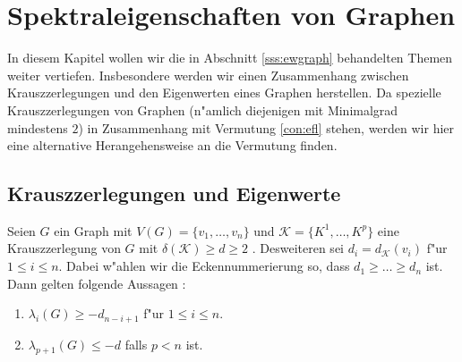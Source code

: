 \section{Spektraleigenschaften von Graphen}

In diesem Kapitel wollen wir die in Abschnitt \ref{sss:ewgraph} behandelten Themen weiter vertiefen. Insbesondere werden wir einen Zusammenhang zwischen Krauszzerlegungen und den Eigenwerten eines Graphen herstellen. Da spezielle Krauszzerlegungen von Graphen (n"amlich diejenigen mit Minimalgrad mindestens $2$) in Zusammenhang mit Vermutung \ref{con:efl} stehen, werden wir hier eine alternative Herangehensweise an die Vermutung finden. 

\subsection{Krauszzerlegungen und Eigenwerte}
\begin{theorem}
  \label{thm:KrauszEigenwerte}
  Seien $G$ ein Graph mit $V(G)=\{v_1,\dots,v_n\}$ und $\mathcal K=\{K^1,\dots,K^p\}$ eine Krauszzerlegung von $G$ mit $\delta(\mathcal K) \geq d \geq 2$ . Desweiteren sei $d_i = d_{\mathcal{K}}(v_{i})$ f"ur $1\leq i \leq n$. 
  Dabei w"ahlen wir die Eckennummerierung so, dass $d_1 \geq \dots \geq d_{n}$ ist.
  Dann gelten folgende Aussagen : 
  \begin{enumerate}[label=\rm{(\alph*)}]
    \item $\lambda_i(G) \geq -d_{n-i+1}$ f"ur $1\leq i \leq n$.
    \item $\lambda_{p+1}(G) \leq -d$ falls $p < n$ ist.
  \end{enumerate}
\end{theorem}

